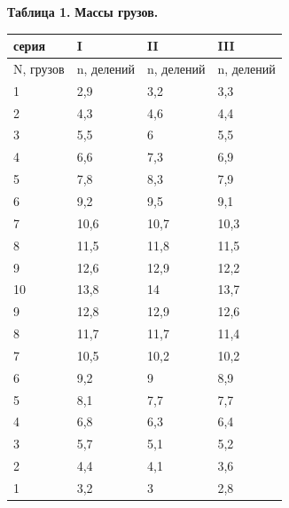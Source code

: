 \begin{flushright}
{\scriptsize \textbf{Таблица 1.} \textbf {Массы грузов.}}
\end{flushright}  
 

\newpage
\begin{table}[H]
\centering
\begin{tabular}{|l|l|l|l|}
\hline
серия     & I          & II         & III        \\ \hline
N, грузов & n, делений & n, делений & n, делений \\ \hline
1         & 2,9        & 3,2        & 3,3        \\ \hline
2         & 4,3        & 4,6        & 4,4        \\ \hline
3         & 5,5        & 6          & 5,5        \\ \hline
4         & 6,6        & 7,3        & 6,9        \\ \hline
5         & 7,8        & 8,3        & 7,9        \\ \hline
6         & 9,2        & 9,5        & 9,1        \\ \hline
7         & 10,6       & 10,7       & 10,3       \\ \hline
8         & 11,5       & 11,8       & 11,5       \\ \hline
9         & 12,6       & 12,9       & 12,2       \\ \hline
10        & 13,8       & 14         & 13,7       \\ \hline
9         & 12,8       & 12,9       & 12,6       \\ \hline
8         & 11,7       & 11,7       & 11,4       \\ \hline
7         & 10,5       & 10,2       & 10,2       \\ \hline
6         & 9,2        & 9          & 8,9        \\ \hline
5         & 8,1        & 7,7        & 7,7        \\ \hline
4         & 6,8        & 6,3        & 6,4        \\ \hline
3         & 5,7        & 5,1        & 5,2        \\ \hline
2         & 4,4        & 4,1        & 3,6        \\ \hline
1         & 3,2        & 3          & 2,8        \\ \hline
\end{tabular}
\end{table}  
    
